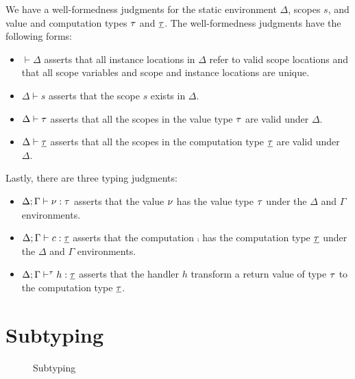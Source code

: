 {We have a well-formedness judgments for the static environment $\Delta$, scopes $s$, and value and computation types $\tau$ and $\underline{\tau}$.
The well-formedness judgments have the following forms:
\begin{itemize}
\setlength\itemsep{0.5em}
\item $\vdash \Delta$ asserts that all instance locations in $\Delta$ refer to valid scope locations and that all scope variables and scope and instance locations are unique.
\item $\Delta \vdash s$ asserts that the scope $s$ exists in $\Delta$.
\item $\Delta \vdash \tau$ asserts that all the scopes in the value type $\tau$ are valid under $\Delta$.
\item $\Delta \vdash \underline{\tau}$ asserts that all the scopes in the computation type $\underline{\tau}$ are valid under $\Delta$.
\end{itemize}

Lastly, there are three typing judgments:
\begin{itemize}
\setlength\itemsep{0.5em}
\item $\Delta;\Gamma \vdash \nu : \tau$ asserts that the value $\nu$ has the value type $\tau$ under the $\Delta$ and $\Gamma$ environments.
\item $\Delta;\Gamma \vdash c : \underline{\tau}$ asserts that the computation $\comp$ has the computation type $\underline{\tau}$ under the $\Delta$ and $\Gamma$ environments.
\item $\Delta;\Gamma \vdash^{\tau} h : \underline{\tau}$ asserts that the handler $h$ transform a return value of type $\tau$ to the computation type $\underline{\tau}$.
\end{itemize}

\section{Subtyping}
\label{sec:subtyping}
\begin{figure}[h]
\caption{Subtyping}
\centering
{}
\end{figure}

}
